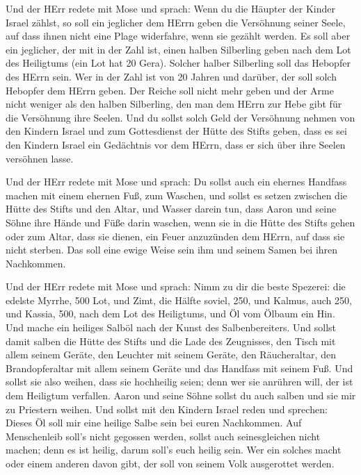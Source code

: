  Und der HErr redete mit Mose und sprach: 
Wenn du die Häupter der Kinder Israel zählst, so soll ein jeglicher dem
HErrn geben die Versöhnung seiner Seele, auf dass ihnen nicht eine Plage
widerfahre, wenn sie gezählt werden.  Es soll aber ein
jeglicher, der mit in der Zahl ist, einen halben Silberling geben nach
dem Lot des Heiligtums (ein Lot hat 20 Gera). Solcher halber Silberling
soll das Hebopfer des HErrn sein.  Wer in der Zahl ist von
20 Jahren und darüber, der soll solch Hebopfer dem HErrn geben.
 Der Reiche soll nicht mehr geben und der Arme nicht
weniger als den halben Silberling, den man dem HErrn zur Hebe gibt für
die Versöhnung ihre Seelen.  Und du sollst solch Geld der
Versöhnung nehmen von den Kindern Israel und zum Gottesdienst der Hütte
des Stifts geben, dass es sei den Kindern Israel ein Gedächtnis vor dem
HErrn, dass er sich über ihre Seelen versöhnen lasse.

 Und der HErr redete mit Mose und sprach:  Du
sollst auch ein ehernes Handfass machen mit einem ehernen Fuß, zum
Waschen, und sollst es setzen zwischen die Hütte des Stifts und den
Altar, und Wasser darein tun,  dass Aaron und seine Söhne
ihre Hände und Füße darin waschen,  wenn sie in die Hütte
des Stifts gehen oder zum Altar, dass sie dienen, ein Feuer anzuzünden
dem HErrn,  auf dass sie nicht sterben. Das soll eine ewige
Weise sein ihm und seinem Samen bei ihren Nachkommen.

 Und der HErr redete mit Mose und sprach: 
Nimm zu dir die beste Spezerei: die edelste Myrrhe, 500 Lot, und Zimt,
die Hälfte soviel, 250, und Kalmus, auch 250,  und Kassia,
500, nach dem Lot des Heiligtums, und Öl vom Ölbaum ein Hin.
 Und mache ein heiliges Salböl nach der Kunst des
Salbenbereiters.  Und sollst damit salben die Hütte des
Stifts und die Lade des Zeugnisses,  den Tisch mit allem
seinem Geräte, den Leuchter mit seinem Geräte, den Räucheraltar,
 den Brandopferaltar mit allem seinem Geräte und das
Handfass mit seinem Fuß.  Und sollst sie also weihen, dass
sie hochheilig seien; denn wer sie anrühren will, der ist dem Heiligtum
verfallen.  Aaron und seine Söhne sollst du auch salben und
sie mir zu Priestern weihen.  Und sollst mit den Kindern
Israel reden und sprechen: Dieses Öl soll mir eine heilige Salbe sein
bei euren Nachkommen.  Auf Menschenleib soll's nicht
gegossen werden, sollst auch seinesgleichen nicht machen; denn es ist
heilig, darum soll's euch heilig sein.  Wer ein solches
macht oder einem anderen davon gibt, der soll von seinem Volk
ausgerottet werden.

